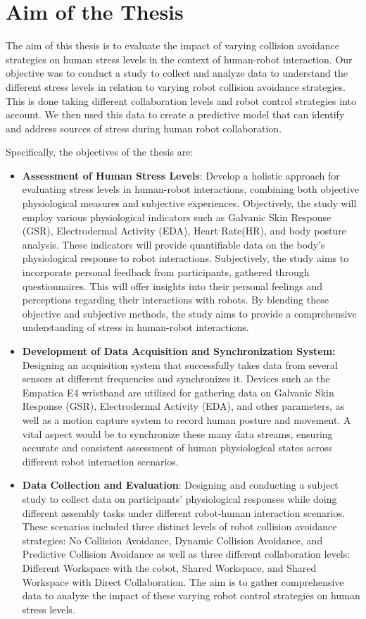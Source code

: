 \section{Aim of the Thesis}
The aim of this thesis is to evaluate the impact of varying collision avoidance strategies on human stress levels in the context of human-robot interaction. Our objective was to conduct a study to collect and analyze data to understand the different stress levels in relation to varying robot collision avoidance strategies. This is done taking different collaboration levels and robot control strategies into account. We then used this data to create a predictive model that can identify and address sources of stress during human robot collaboration.

Specifically, the objectives of the thesis are: 
\begin{itemize}
	\item \textbf{Assessment of Human Stress Levels}: Develop a holistic approach for evaluating stress levels in human-robot interactions, combining both objective physiological measures and subjective experiences. Objectively, the study will employ various physiological indicators such as Galvanic Skin Response (GSR), Electrodermal Activity (EDA), Heart Rate(HR), and body posture analysis. These indicators will provide quantifiable data on the body's physiological response to robot interactions. Subjectively, the study aims to incorporate personal feedback from participants, gathered through questionnaires. This will offer insights into their personal feelings and perceptions regarding their interactions with robots. By blending these objective and subjective methods, the study aims to provide a comprehensive understanding of stress in human-robot interactions.
	\item \textbf{Development of Data Acquisition and Synchronization System:} Designing an acquisition system that successfully takes data from several sensors at different frequencies and synchronizes it. Devices such as the Empatica E4 wristband are utilized for gathering data on Galvanic Skin Response (GSR), Electrodermal Activity (EDA), and other parameters, as well as a motion capture system to record human posture and movement. A vital aspect would be to synchronize these many data streams, ensuring accurate and consistent assessment of human physiological states across different robot interaction scenarios. 
	\item \textbf{Data Collection and Evaluation}: Designing and conducting a subject study to collect data on participants' physiological responses while doing different assembly tasks under different robot-human interaction scenarios. These scenarios included three distinct levels of robot collision avoidance strategies: No Collision Avoidance, Dynamic Collision Avoidance, and Predictive Collision Avoidance as well as three different collaboration levels: Different Workspace with the cobot, Shared Workspace, and Shared Workspace with Direct Collaboration. The aim is to gather comprehensive data to analyze the impact of these varying robot control strategies on human stress levels. 

\end{itemize}
